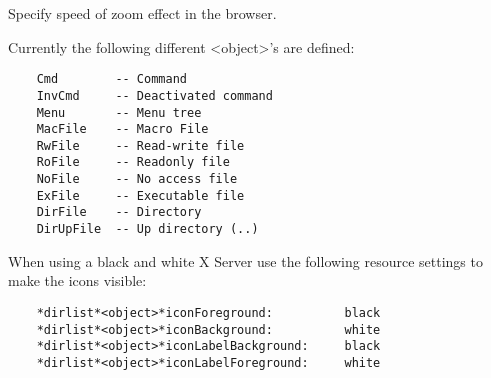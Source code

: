    Specify speed of zoom effect in the browser.

   Currently the following different <object>'s are defined:

\begin{verbatim}
    Cmd        -- Command
    InvCmd     -- Deactivated command
    Menu       -- Menu tree
    MacFile    -- Macro File
    RwFile     -- Read-write file
    RoFile     -- Readonly file
    NoFile     -- No access file
    ExFile     -- Executable file
    DirFile    -- Directory
    DirUpFile  -- Up directory (..)
\end{verbatim}

   When using a black and white X Server use the following resource settings
   to make the icons visible:

\begin{verbatim}
    *dirlist*<object>*iconForeground:          black
    *dirlist*<object>*iconBackground:          white
    *dirlist*<object>*iconLabelBackground:     black
    *dirlist*<object>*iconLabelForeground:     white
\end{verbatim}


